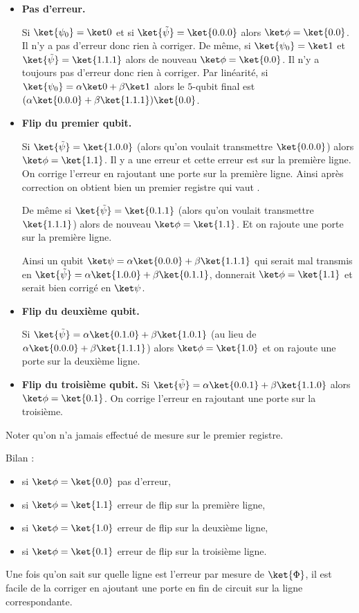 \documentclass[11pt,class=report,crop=false]{standalone}
\begin{document}
\begin{itemize}
  \item \textbf{Pas d'erreur.}

  Si $\ket{\psi_0}=\ket0$ et si $\ket{\tilde\psi} = \ket{0.0.0}$ alors $\ket\phi = \ket{0.0}$. Il n'y a pas d'erreur donc rien à corriger.
  De même, si $\ket{\psi_0}=\ket1$ et $\ket{\tilde\psi} = \ket{1.1.1}$ alors de nouveau $\ket\phi = \ket{0.0}$. Il n'y a toujours pas d'erreur donc rien à corriger.
  Par linéarité, si $\ket{\psi_0}=\alpha\ket0+\beta\ket1$ alors le $5$-qubit final est $(\alpha\ket{0.0.0}+\beta\ket{1.1.1})\ket{0.0}$.

  \item  \textbf{Flip du premier qubit.}

  Si $\ket{\tilde\psi} = \ket{1.0.0}$ (alors qu'on voulait transmettre $\ket{0.0.0}$) alors $\ket\phi = \ket{1.1}$. Il y a une erreur et cette erreur est sur la première ligne. On corrige l'erreur en rajoutant une porte  sur la première ligne. Ainsi après correction on obtient bien un premier registre qui vaut .

  De même si $\ket{\tilde\psi} = \ket{0.1.1}$ (alors qu'on voulait transmettre $\ket{1.1.1}$) alors de nouveau $\ket\phi = \ket{1.1}$. Et on rajoute une porte  sur la première ligne.

  Ainsi un qubit $\ket\psi = \alpha\ket{0.0.0} + \beta\ket{1.1.1}$ qui serait mal transmis en $\ket{\tilde\psi} =\alpha\ket{1.0.0} + \beta\ket{0.1.1}$, donnerait $\ket\phi = \ket{1.1}$ et serait bien corrigé en $\ket\psi$.

  \item  \textbf{Flip du deuxième qubit.}

  Si $\ket{\tilde\psi} = \alpha\ket{0.1.0} + \beta\ket{1.0.1}$ (au lieu de $\alpha\ket{0.0.0} + \beta\ket{1.1.1}$) alors $\ket\phi = \ket{1.0}$ et on rajoute une porte  sur la deuxième ligne.  

  \item  \textbf{Flip du troisième qubit.}
Si $\ket{\tilde\psi} = \alpha\ket{0.0.1} + \beta\ket{1.1.0}$ alors $\ket\phi = \ket{0.1}$. On corrige l'erreur en rajoutant une porte  sur la troisième.
\end{itemize}

Noter qu'on n'a jamais effectué de mesure sur le premier registre.

\medskip

Bilan : 
\begin{itemize}
  \item si $\ket\phi = \ket{0.0}$ pas d'erreur,
  \item si $\ket\phi = \ket{1.1}$ erreur de flip sur la première ligne,
  \item si $\ket\phi = \ket{1.0}$ erreur de flip sur la deuxième ligne,
  \item si $\ket\phi = \ket{0.1}$ erreur de flip sur la troisième ligne.
\end{itemize}
Une fois qu'on sait sur quelle ligne est l'erreur par mesure de $\ket{\Phi}$, il est facile de la corriger en ajoutant une porte  en fin de circuit sur la ligne correspondante.
\end{document}
